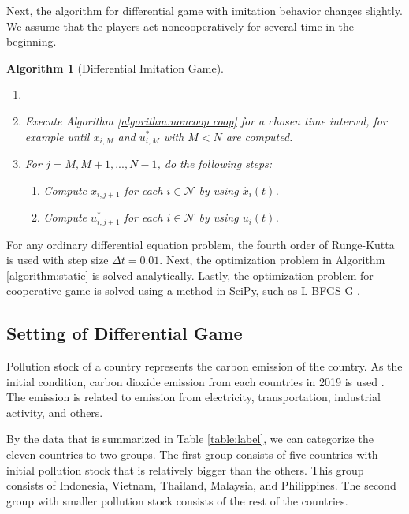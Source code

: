 \documentclass[a4paper,fleqn]{cas-dc}
\newtheorem{algorithm}{Algorithm}
\begin{document}
Next, the algorithm for differential game with imitation behavior changes slightly. We assume that the players act noncooperatively for several time in the beginning.

\begin{algorithm}[Differential Imitation Game] \label{algorith:imitasi}
\begin{enumerate}
    \item[]
    \item Execute Algorithm \ref{algorithm:noncoop coop} for a chosen time interval, for example until $x_{i,M}$ and $u_{i,M}^*$ with $M<N$ are computed.
    \item For $j=M,M+1,...,N-1$, do the following steps:
    \begin{enumerate}
        \item Compute $x_{i,j+1}$ for each $i\in\mathcal{N}$ by using $\dot{x_i}(t)$.
        \item Compute $u_{i,j+1}^*$ for each $i\in\mathcal{N}$ by using $\dot{u_i}(t)$.
    \end{enumerate}
\end{enumerate}
\end{algorithm}

For any ordinary differential equation problem, the fourth order of Runge-Kutta is used with step size $\Delta t=0.01$. Next, the optimization problem in Algorithm \ref{algorithm:static} is solved analytically. Lastly, the optimization problem for cooperative game is solved using a method in SciPy, such as L-BFGS-G \citep{2020SciPy-NMeth}.

\subsection{Setting of Differential Game}

Pollution stock of a country represents the carbon emission of the country. As the initial condition, carbon dioxide emission from each countries in 2019 is used \citep{lau, IRENA}. The emission is related to emission from electricity, transportation, industrial activity, and others.

By the data that is summarized in Table \ref{table:label}, we can categorize the eleven countries to two groups. The first group consists of five countries with initial pollution stock that is relatively bigger than the others. This group consists of Indonesia, Vietnam, Thailand, Malaysia, and Philippines. The second group with smaller pollution stock consists of the rest of the countries.
\end{document}
